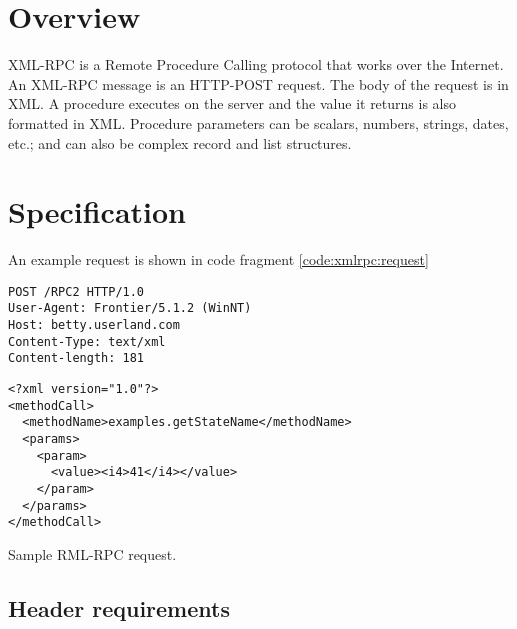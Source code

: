 %
%


\label{chap:xml-rpc}

%
%

\section{Overview}

XML-RPC is a Remote Procedure Calling protocol that works over the Internet.
An XML-RPC message is an HTTP-POST request. The body of the request is in XML. A procedure executes on the server and the value it returns is also formatted in XML.
Procedure parameters can be scalars, numbers, strings, dates, etc.; and can also be complex record and list structures.



%
%

\section{Specification}

An example request is shown in code fragment \ref{code:xmlrpc:request}

\begin{code}
\begin{verbatim}
POST /RPC2 HTTP/1.0
User-Agent: Frontier/5.1.2 (WinNT)
Host: betty.userland.com
Content-Type: text/xml
Content-length: 181
\end{verbatim}

\begin{lstlisting}
<?xml version="1.0"?>
<methodCall>
  <methodName>examples.getStateName</methodName>
  <params>
    <param>
      <value><i4>41</i4></value>
    </param>
  </params>
</methodCall>
\end{lstlisting}
\caption{Sample RML-RPC request.}
\label{code:xmlrpc:request}
\end{code}

\subsection{Header requirements}

